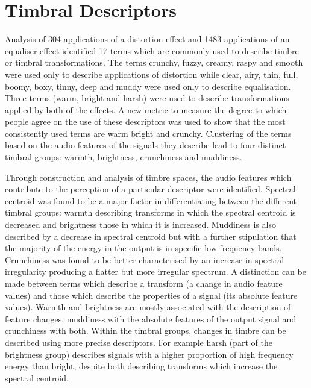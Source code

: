 \section{Timbral Descriptors}
\label{sec:Conclusion-Descriptors}
	Analysis of 304 applications of a distortion effect and 1483 applications of an equaliser effect identified 17 terms
	which are commonly used to describe timbre or timbral transformations. The terms crunchy, fuzzy, creamy, raspy and
	smooth were used only to describe applications of distortion while clear, airy, thin, full, boomy, boxy, tinny, deep
	and muddy were used only to describe equalisation. Three terms (warm, bright and harsh) were used to describe
	transformations applied by both of the effects. A new metric to measure the degree to which people agree on the use
	of these descriptors was used to show that the most consistently used terms are warm bright and crunchy. Clustering
	of the terms based on the audio features of the signals they describe lead to four distinct timbral groups:
	warmth, brightness, crunchiness and muddiness. 

	Through construction and analysis of timbre spaces, the audio features which contribute to the perception of a
	particular descriptor were identified. Spectral centroid was found to be a major factor in differentiating between
	the different timbral groups: warmth describing transforms in which the spectral centroid is decreased and
	brightness those in which it is increased. Muddiness is also described by a decrease in spectral centroid but with a
	further stipulation that the majority of the energy in the output is in specific low frequency bands. Crunchiness
	was found to be better characterised by an increase in spectral irregularity producing a flatter but more irregular
	spectrum. A distinction can be made between terms which describe a transform (a change in audio feature values) and
	those which describe the properties of a signal (its absolute feature values). Warmth and brightness are mostly
	associated with the description of feature changes, muddiness with the absolute features of the output signal and
	crunchiness with both. Within the timbral groups, changes in timbre can be described using more precise descriptors.
	For example harsh (part of the brightness group) describes signals with a higher proportion of high frequency energy
	than bright, despite both describing transforms which increase the spectral centroid.

